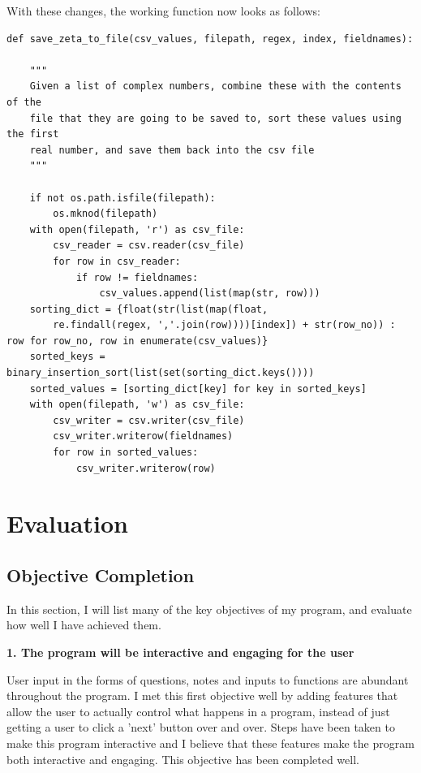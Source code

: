\documentclass{article}
\begin{document}
With these changes, the working function now looks as follows:

\begin{lstlisting}
def save_zeta_to_file(csv_values, filepath, regex, index, fieldnames):

    """
    Given a list of complex numbers, combine these with the contents of the
    file that they are going to be saved to, sort these values using the first
    real number, and save them back into the csv file
    """

    if not os.path.isfile(filepath):
        os.mknod(filepath)
    with open(filepath, 'r') as csv_file:
        csv_reader = csv.reader(csv_file)
        for row in csv_reader:
            if row != fieldnames:
                csv_values.append(list(map(str, row)))
    sorting_dict = {float(str(list(map(float,
        re.findall(regex, ','.join(row))))[index]) + str(row_no)) : row for row_no, row in enumerate(csv_values)}
    sorted_keys = binary_insertion_sort(list(set(sorting_dict.keys())))
    sorted_values = [sorting_dict[key] for key in sorted_keys]
    with open(filepath, 'w') as csv_file:
        csv_writer = csv.writer(csv_file)
        csv_writer.writerow(fieldnames)
        for row in sorted_values:
            csv_writer.writerow(row)
\end{lstlisting}
\clearpage
\section{Evaluation}


\subsection{Objective Completion}

In this section, I will list many of the key objectives of my program, and evaluate how well I have achieved them.

\textbf{1. The program will be interactive and engaging for the user}

User input in the forms of questions, notes and inputs to functions are abundant throughout the program. I met this first objective well by adding features that allow the user to actually control what happens in a program, instead of just getting a user to click a 'next' button over and over. Steps have been taken to make this program interactive and I believe that these features make the program both interactive and engaging. This objective has been completed well.
\end{document}
